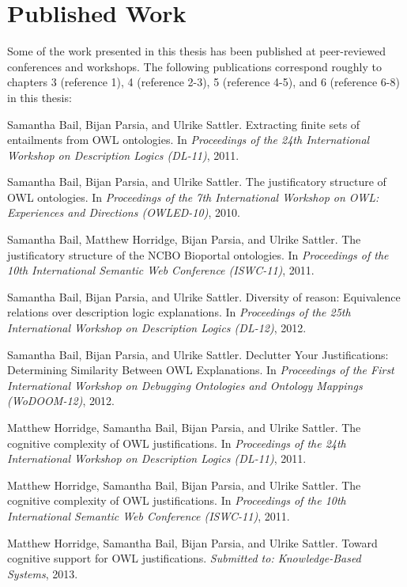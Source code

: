 \section{Published Work}
Some of the work presented in this thesis has been published at peer-reviewed conferences and workshops. The following publications correspond roughly to chapters 3 (reference 1), 4 (reference 2-3), 5 (reference 4-5), and 6 (reference 6-8) in this thesis:

\begin{compactenum}

\item \cite{bail11kk} Samantha Bail, Bijan Parsia, and Ulrike Sattler. Extracting finite sets of entailments from OWL ontologies. In \emph{Proceedings of the 24th International Workshop on Description Logics (DL-11)}, 2011.

\item \cite{bail10kb} Samantha Bail, Bijan Parsia, and Ulrike Sattler. The justificatory structure of OWL ontologies. In \emph{Proceedings of the 7th International Workshop on OWL: Experiences and Directions (OWLED-10)}, 2010.

\item \cite{bail11jm} Samantha Bail, Matthew Horridge, Bijan Parsia, and Ulrike Sattler. The justificatory structure of the NCBO Bioportal ontologies. In \emph{Proceedings of the 10th International Semantic Web Conference (ISWC-11)}, 2011.

\item \cite{bail12aa} Samantha Bail, Bijan Parsia, and Ulrike Sattler. Diversity of reason: Equivalence relations over description logic explanations. In \emph{Proceedings of the 25th International Workshop on Description Logics (DL-12)}, 2012.

\item \cite{bail12ab} Samantha Bail, Bijan Parsia, and Ulrike Sattler. Declutter Your Justifications: Determining Similarity Between OWL Explanations. In \emph{Proceedings of the First International Workshop on Debugging Ontologies and Ontology Mappings (WoDOOM-12)}, 2012.

\item \cite{horridge11si} Matthew Horridge, Samantha Bail, Bijan Parsia, and Ulrike Sattler. The cognitive complexity of OWL justifications. In \emph{Proceedings of the 24th International Workshop on Description Logics (DL-11)}, 2011.

\item \cite{horridge11gj} Matthew Horridge, Samantha Bail, Bijan Parsia, and Ulrike Sattler. The cognitive complexity of OWL justifications. In \emph{Proceedings of the 10th International Semantic Web Conference (ISWC-11)}, 2011.

\item \cite{horridge13aa} Matthew Horridge, Samantha Bail, Bijan Parsia, and Ulrike Sattler. Toward cognitive support for OWL justifications. \emph{Submitted to: Knowledge-Based Systems}, 2013.

\end{compactenum}




